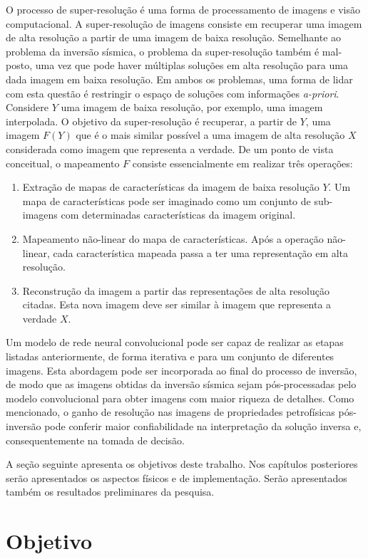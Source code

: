O processo de super-resolução é uma forma de processamento de imagens e visão computacional.
A super-resolução de imagens consiste em recuperar uma imagem de alta resolução a partir de uma imagem
de baixa resolução. Semelhante ao problema da inversão sísmica, o problema da super-resolução
também é mal-posto, uma vez que pode haver múltiplas soluções em alta resolução para uma dada imagem em baixa
resolução. Em ambos os problemas, uma forma de lidar com esta questão é restringir o espaço
de soluções com informações \textit{a-priori}. 
Considere $Y$ uma imagem de baixa resolução, por exemplo, uma
imagem interpolada. O objetivo da super-resolução é
recuperar, a partir de $Y$, uma imagem $F(Y)$ que é
o mais similar possível a uma imagem de alta resolução $X$
considerada como imagem que representa a verdade.
De um ponto de vista conceitual, o mapeamento $F$ consiste essencialmente em
realizar três operações:
\begin{enumerate}
 \item Extração de mapas de características da imagem de baixa resolução $Y$. Um mapa de características
 pode ser imaginado como um conjunto de sub-imagens com determinadas características da imagem original.
 \item Mapeamento não-linear do mapa de características. Após a operação não-linear, cada característica mapeada
 passa a ter uma representação em alta resolução.
 \item Reconstrução da imagem a partir das representações de alta resolução citadas. Esta nova imagem
 deve ser similar à imagem que representa a verdade $X$.
\end{enumerate}

Um modelo de rede neural convolucional pode ser capaz de realizar as etapas listadas anteriormente,
de forma iterativa e para um conjunto de diferentes imagens.
Esta abordagem pode ser incorporada ao final do processo de inversão, de modo que as
imagens obtidas da inversão sísmica sejam pós-processadas pelo modelo convolucional
para obter imagens com maior riqueza de detalhes. Como mencionado, o ganho de resolução
nas imagens de propriedades petrofísicas pós-inversão pode conferir maior confiabilidade
na interpretação da solução inversa e, consequentemente na tomada de decisão.

A seção seguinte apresenta os objetivos deste trabalho. Nos capítulos posteriores
serão apresentados os aspectos físicos e de implementação. Serão
apresentados também os resultados preliminares da pesquisa.

\section{Objetivo}


